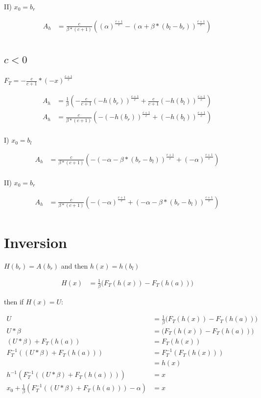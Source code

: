 \documentclass[]{article}
\begin{document}
II) $x_0 = b_r$

\begin{align*}
A_h &= \frac{c}{\beta * (c + 1)}  \left( (\alpha)^{\frac{c + 1}{c}} - (\alpha + \beta * (b_l - b_r))^{\frac{c + 1}{c}} \right) \\
\end{align*}

\subsection{$c < 0$}

$F_T = - \frac{c}{c + 1} * (-x)^{\frac{c + 1}{c}}$

\begin{align*}
A_h &= \frac{1}{\beta} \left( - \frac{c}{c + 1} (-h(b_r))^{\frac{c + 1}{c}} + \frac{c}{c + 1} (-h(b_l))^{\frac{c + 1}{c}} \right) \\
A_h &= \frac{c}{\beta * (c + 1)}  \left( - (-h(b_r))^{\frac{c + 1}{c}} + (-h(b_l))^{\frac{c + 1}{c}} \right) \\
\end{align*}

I) $x_0 = b_l$

\begin{align*}
A_h &= \frac{c}{\beta * (c + 1)}  \left( - (- \alpha - \beta * (b_r - b_l))^{\frac{c + 1}{c}} + (-\alpha)^{\frac{c + 1}{c}} \right) \\
\end{align*}

II) $x_0 = b_r$

\begin{align*}
A_h &= \frac{c}{\beta * (c + 1)}  \left(- (-\alpha)^{\frac{c + 1}{c}} + (- \alpha - \beta * (b_r - b_l))^{\frac{c + 1}{c}}\right) \\
\end{align*}

\section{Inversion}

$H(b_r) = A(b_r)$ and then $h(x) = h(b_l)$

\begin{align*}
H(x) &= \frac{1}{\beta} \big( F_T (h(x)) - F_T(h(a)) \big)
\end{align*}

then if $H(x) = U$:

\begin{align*}
U &= \frac{1}{\beta} \big( F_T (h(x)) - F_T(h(a)) \big) \\
U * \beta &=\big( F_T (h(x)) - F_T(h(a)) \big) \\
(U * \beta) + F_T(h(a)) &= F_T (h(x)) \\
F_T^{-1} ( (U * \beta) + F_T(h(a))) &= F_T^{-1}( F_T (h(x))) \\
 &= h(x) \\
h^{-1} \left( F_T^{-1} ( (U * \beta) + F_T(h(a))) \right) &= x \\
x_0 + \frac{1}{\beta} \left( F_T^{-1} ( (U * \beta) + F_T(h(a))) - \alpha \right) &= x
\end{align*}
\end{document}

